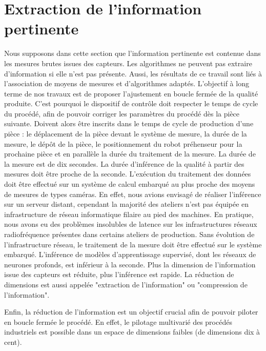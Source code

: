 \section{Extraction de l'information pertinente} \label{sec:extraction}
Nous supposons dans cette section que l'information pertinente est contenue dans les mesures brutes issues des capteurs.
Les algorithmes ne peuvent pas extraire d'information si elle n'est pas présente.
Aussi, les résultats de ce travail sont liés à l'association de moyens de mesures et d'algorithmes adaptés.
L'objectif à long terme de nos travaux est de proposer l'ajustement en boucle fermée de la qualité produite.
C'est pourquoi le dispositif de contrôle doit respecter le temps de cycle du procédé, afin de pouvoir corriger les paramètres du procédé dès la pièce suivante.
Doivent alors être inscrits dans le temps de cycle de production d'une pièce : le déplacement de la pièce devant le système de mesure, la durée de la mesure, le dépôt de la pièce, le positionnement du robot préhenseur pour la prochaine pièce et en parallèle la durée du traitement de la mesure.
La durée de la mesure est de dix secondes.
La durée d'inférence de la qualité à partir des mesures doit être proche de la seconde.
L'exécution du traitement des données doit être effectué sur un système de calcul embarqué au plus proche des moyens de mesures de types caméras.
En effet, nous avions envisagé de réaliser l'inférence sur un serveur distant, cependant la majorité des ateliers n'est pas équipée en infrastructure de réseau informatique filaire au pied des machines.
En pratique, nous avons eu des problèmes insolubles de latence sur les infrastructures réseaux radiofréquence présentes dans certains ateliers de production.
Sans évolution de l'infrastructure réseau, le traitement de la mesure doit être effectué sur le système embarqué.
L'inférence de modèles d'apprentissage supervisé, dont les réseaux de neurones profonds, est inférieur à la seconde.
Plus la dimension de l'information issue des capteurs est réduite, plus l'inférence est rapide.
La réduction de dimensions est aussi appelée "extraction de l'information" ou "compression de l'information".

Enfin, la réduction de l'information est un objectif crucial afin de pouvoir piloter en boucle fermée le procédé.
En effet, le pilotage multivarié des procédés industriels est possible dans un espace de dimensions faibles (de dimensions dix à cent).

